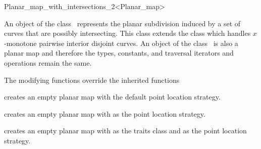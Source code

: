 
\ccRefPageBegin

\begin{ccRefClass}{Planar_map_with_intersections_2<Planar_map>}

\ccDefinition An object  of the class
    \ccClassTemplateName\ represents the planar
    subdivision induced by a set of curves that are possibly intersecting.
    This class extends the class 
    which handles $x$-monotone pairwise interior disjoint
    curves.  %
    An object of the class \ccClassTemplateName\ is also a planar map and
    therefore the types, constants, and traversal iterators and operations remain
    the same.


\ccInheritsFrom

    The modifying functions 
    override the inherited functions

\ccTypes


\ccCreation

     {creates an empty planar map with the default point location strategy.}

    {creates an empty planar map with  as the point location strategy.}

    {creates an empty planar map with  as the traits class and  as the point location strategy.}


\end{ccRefClass}
